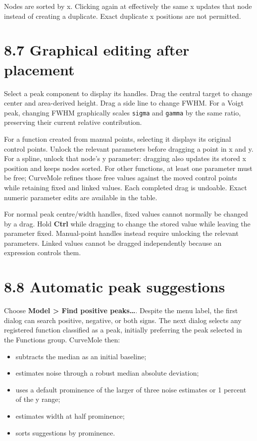 \documentclass[
  10pt,
  a4paper,
  oneside]{scrreprt}
\providecommand{\tightlist}{%
  \setlength{\itemsep}{0pt}\setlength{\parskip}{0pt}}
\begin{document}
Nodes are sorted by x. Clicking again at effectively the same x updates
that node instead of creating a duplicate. Exact duplicate x positions
are not permitted.

\hypertarget{graphical-editing-after-placement}{%
\section{8.7 Graphical editing after
placement}\label{graphical-editing-after-placement}}

Select a peak component to display its handles. Drag the central target
to change center and area-derived height. Drag a side line to change
FWHM. For a Voigt peak, changing FWHM graphically scales \texttt{sigma}
and \texttt{gamma} by the same ratio, preserving their current relative
contribution.

For a function created from manual points, selecting it displays its
original control points. Unlock the relevant parameters before dragging
a point in x and y. For a spline, unlock that node's y parameter:
dragging also updates its stored x position and keeps nodes sorted. For
other functions, at least one parameter must be free; CurveMole refines
those free values against the moved control points while retaining fixed
and linked values. Each completed drag is undoable. Exact numeric
parameter edits are available in the table.

For normal peak centre/width handles, fixed values cannot normally be
changed by a drag. Hold \textbf{Ctrl} while dragging to change the
stored value while leaving the parameter fixed. Manual-point handles
instead require unlocking the relevant parameters. Linked values cannot
be dragged independently because an expression controls them.

\hypertarget{automatic-peak-suggestions}{%
\section{8.8 Automatic peak
suggestions}\label{automatic-peak-suggestions}}

Choose \textbf{Model \textgreater{} Find positive peaks\ldots{}}.
Despite the menu label, the first dialog can search positive, negative,
or both signs. The next dialog selects any registered function
classified as a peak, initially preferring the peak selected in the
Functions group. CurveMole then:

\begin{itemize}
\tightlist
\item
  subtracts the median as an initial baseline;
\item
  estimates noise through a robust median absolute deviation;
\item
  uses a default prominence of the larger of three noise estimates or 1
  percent of the y range;
\item
  estimates width at half prominence;
\item
  sorts suggestions by prominence.
\end{itemize}
\end{document}

